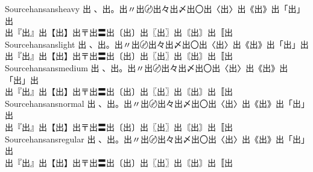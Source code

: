 \begin{tabbing}
Sourcehansansheavy \> {\mktsFontfileSourcehansansheavy{}出 、出。出〃出〄出々出〆出〇出〈出〉出《出》出「出」出}\\
\> {\mktsFontfileSourcehansansheavy{}出『出』出【出】出〒出〓出〔出〕出〖出〗出〘出〙出〚出} \\
Sourcehansanslight \> {\mktsFontfileSourcehansanslight{}出 、出。出〃出〄出々出〆出〇出〈出〉出《出》出「出」出}\\
\> {\mktsFontfileSourcehansanslight{}出『出』出【出】出〒出〓出〔出〕出〖出〗出〘出〙出〚出} \\
Sourcehansansmedium \> {\mktsFontfileSourcehansansmedium{}出 、出。出〃出〄出々出〆出〇出〈出〉出《出》出「出」出}\\
\> {\mktsFontfileSourcehansansmedium{}出『出』出【出】出〒出〓出〔出〕出〖出〗出〘出〙出〚出} \\
Sourcehansansnormal \> {\mktsFontfileSourcehansansnormal{}出 、出。出〃出〄出々出〆出〇出〈出〉出《出》出「出」出}\\
\> {\mktsFontfileSourcehansansnormal{}出『出』出【出】出〒出〓出〔出〕出〖出〗出〘出〙出〚出} \\
Sourcehansansregular \> {\mktsFontfileSourcehansansregular{}出 、出。出〃出〄出々出〆出〇出〈出〉出《出》出「出」出}\\
\> {\mktsFontfileSourcehansansregular{}出『出』出【出】出〒出〓出〔出〕出〖出〗出〘出〙出〚出} \\
\end{tabbing}


